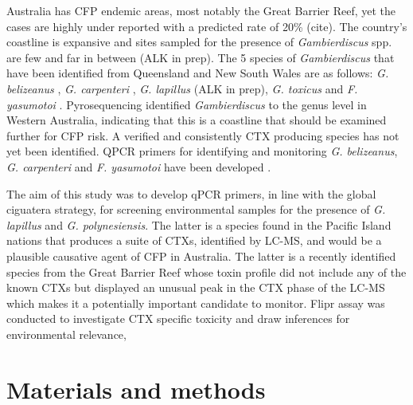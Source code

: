 \documentclass[12pt]{article}
\begin{document}
Australia has CFP endemic areas, most notably the Great Barrier Reef, yet the cases are highly under reported with a predicted rate of 20\% (cite). The country's coastline is expansive and sites sampled for the presence of \emph{Gambierdiscus} spp. are few and far in between (ALK in prep). The 5 species of \emph{Gambierdiscus} that have been identified from Queensland and New South Wales are as follows:  \emph{G. belizeanus}  \citep{murray2014molecular}, \emph{G. carpenteri} \citep{kohli2014high}, \emph{G. lapillus} (ALK in prep), \emph{G. toxicus} \citep{hallegraeff2010algae} and \emph{F. yasumotoi}  \citep{murray2014molecular}. Pyrosequencing identified \emph{Gambierdiscus} to the genus level in Western Australia, indicating that this is a coastline that should be examined further for CFP risk. A verified and consistently CTX producing species has not yet been identified. 
QPCR primers for identifying and monitoring \emph{G. belizeanus}, \emph{G. carpenteri} and \emph{F. yasumotoi} have been developed \cite{nishimura2016quantitative,vandersea2012development}.

The aim of this study was to develop qPCR primers, in line with the global ciguatera strategy, for screening environmental samples for the presence of \emph{G. lapillus} and \emph{G. polynesiensis}. The latter is a species found in the Pacific Island nations that produces a suite of CTXs, identified by LC-MS, and would be a plausible causative agent of CFP in Australia. The latter is a recently identified species from the Great Barrier Reef whose toxin profile did not include any of the known CTXs but displayed an unusual peak in the CTX phase of the LC-MS which makes it a potentially important candidate to monitor. Flipr assay was conducted to investigate CTX specific toxicity and draw inferences for environmental relevance,

\newpage
\section{Materials and methods}
\end{document}
